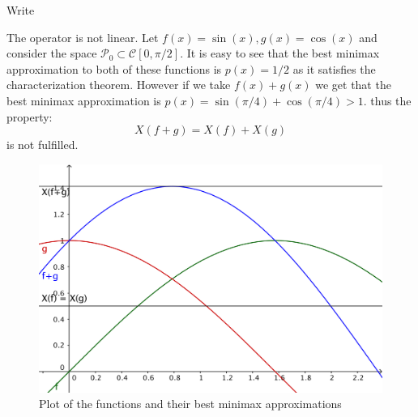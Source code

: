 \begin{problem}
Write
\end{problem}

\begin{solution}
The operator is not linear. Let $f(x) = \sin (x), g(x) = \cos (x)$ and consider the space $\mathcal{P}_0 \subset \mathcal{C}[0, \pi/2]$. It is easy to see that the best minimax approximation to both of these functions is $p(x) = 1/2$ as it satisfies the characterization theorem. However if we take $f(x)+g(x)$ we get that the best minimax approximation is $p(x) = \sin(\pi/4)+\cos(\pi/4)>1$. thus the property:
\begin{equation*}
X(f+g) = X(f) + X(g)
\end{equation*}
is not fulfilled.
\begin{figure}[h]
\centering 
\includegraphics[scale = 0.5]{figtask6.png}
\caption{Plot of the functions and their best minimax approximations}
\label{figtask6}
\end{figure}

\end{solution}